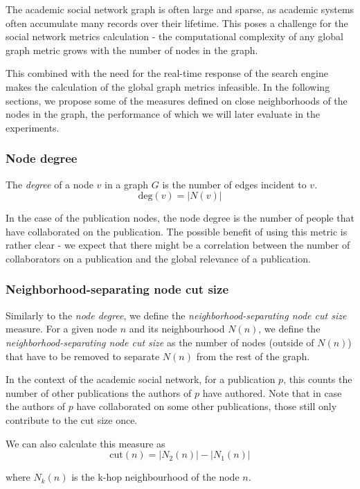 The academic social network graph is often large and sparse, as academic systems often accumulate many records over their lifetime.
This poses a challenge for the social network metrics calculation - the computational complexity of any global graph metric grows 
with the number of nodes in the graph.

This combined with the need for the real-time response of the search engine makes the calculation of the global graph metrics infeasible.
In the following sections, we propose some of the measures defined on close neighborhoods of the nodes in the graph,
the performance of which we will later evaluate in the experiments.

\subsubsection{Node degree}

The \textit{degree} of a node $v$ in a graph $G$ is the number of edges incident to $v$.
$$
\text{deg}(v) = |N(v)|
$$

In the case of the publication nodes, the node degree is the number of people that have collaborated on the publication.
The possible benefit of using this metric is rather clear - we expect that there might be a correlation between the number of collaborators on a publication and the 
global relevance of a publication.

\subsubsection{Neighborhood-separating node cut size}

Similarly to the \textit{node degree}, we define the \textit{neighborhood-separating node cut size} measure.
For a given node $n$ and its neighbourhood $N(n)$, we define the \textit{neighborhood-separating node cut size} 
as the number of nodes (outside of $N(n)$) that have to be removed to separate $N(n)$ from the rest of the graph.

In the context of the academic social network, for a publication $p$, this counts the number of other publications the authors of $p$ have authored.
Note that in case the authors of $p$ have collaborated on some other publications, those still only contribute to the cut size once.

We can also calculate this measure as 
$$
\text{cut}(n) = \lvert N_2(n) \rvert - \lvert N_1(n) \rvert
$$

where $N_k(n)$ is the k-hop neighbourhood of the node $n$.


